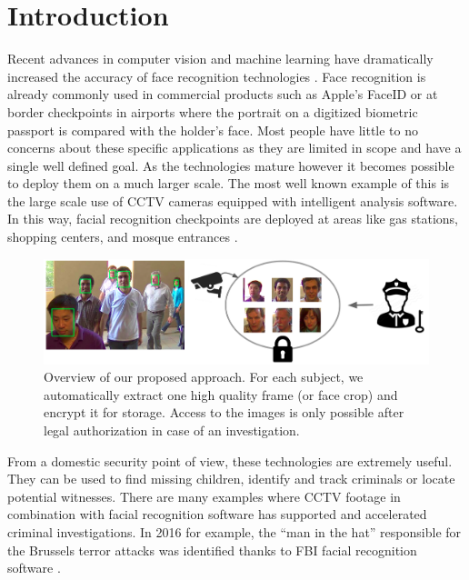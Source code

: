 \documentclass[letterpaper]{article} %
\begin{document}
\section{Introduction}
Recent advances in computer vision and machine learning have dramatically increased the accuracy of face recognition technologies \cite{schroff2015facenet, masi2018deep, deng2019arcface}. Face recognition is already commonly used in commercial products such as Apple's FaceID \cite{faceid} or at border checkpoints in airports where the portrait on a digitized biometric passport is compared with the holder's face. Most people have little to no concerns about these specific applications as they are limited in scope and have a single well defined goal. As the technologies mature however it becomes possible to deploy them on a much larger scale. The most well known example of this is the large scale use of CCTV cameras equipped with intelligent analysis software. In this way, facial recognition checkpoints are deployed at areas like gas stations, shopping centers, and mosque entrances \cite{larson2018china, NOS}.
\begin{figure}
    \centering
    \includegraphics[width=\linewidth]{figures/overview_.png}
    \setlength{\abovecaptionskip}{-2pt}
    \setlength{\belowcaptionskip}{-2pt}
    \caption{Overview of our proposed approach. For each subject, we automatically extract one high quality frame (or face crop) and encrypt it for storage. Access to the images is only possible after legal authorization in case of an investigation.}
    \label{fig:overview}
\end{figure}
From a domestic security point of view, these technologies are extremely useful. They can be used to find missing children, identify and track criminals or locate potential witnesses. There are many examples where CCTV footage in combination with facial recognition software has supported and accelerated criminal investigations. In 2016 for example, the ``man in the hat'' responsible for the Brussels terror attacks was identified thanks to FBI facial recognition software \cite{maninhat}. 
\\
\newline
\end{document}
